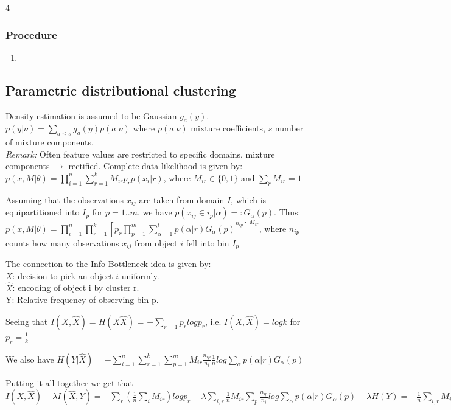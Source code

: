 \documentclass[9pt,parskip]{scrartcl}
\begin{document}
\begin{multicols*}{4}
\subsubsection*{Procedure}
\begin{enumerate}
	\item 
\end{enumerate}

\subsection*{Parametric distributional clustering}
Density estimation is assumed to be Gaussian $g_a(y)$. \\
$p(y| \nu) = \sum_{a \leq s} g_a(y) p(a|\nu)$ where $p(a|\nu)$ mixture coefficients, $s$ number of mixture components.\\
\textit{Remark:} Often feature values are restricted to specific domains, mixture components $\to$ rectified.
Complete data likelihood is given by: $p(x,M|\theta) = \prod_{i=1}^n \sum_{r=1}^k M_{ir}p_rp(x_i|r)$, where $M_{ir} \in \{0,1\}$ and $\sum_r M_{ir} = 1$

Assuming that the observations $x_{ij}$ are taken from domain $I$, which is equipartitioned into $I_p$ for $p= 1..m$, we have $p(x_{ij} \in i_p|\alpha) =: G_{\alpha}(p)$.
Thus:
$p(x,M|\theta) = \prod_{i=1}^n \prod_{r=1}^k[p_r \prod_{p=1}^m {\sum_{\alpha = 1}^l p(\alpha | r)G_{\alpha }(p)}^{n_{ip}}]^{M_{ir}}$,
where $n_{ip}$ counts how many observations $x_{ij}$ from object $i$ fell into bin $I_p$

The connection to the Info Bottleneck idea is given by:\\
$X$: decision to pick an object $i$ uniformly.\\
$\hat X$: encoding of object i by cluster r. \\
Y: Relative frequency of observing bin p.

Seeing that $I(X,\hat X) = H(X\hat X)$ = $-\sum_{r=1} p_r log p_r$, i.e. $I(X,\hat X) = log k$ for $p_r = \frac{1}{k}$

We also have $H(Y|\hat X) = - \sum_{i=1}^n \sum_{r=1}^k \sum_{p=1}^m M_{ir} \frac{n_{ip}}{n_i}\frac{1}{n} log \sum_{\alpha} p(\alpha|r)G_{\alpha}(p)$

Putting it all together we get that $I(X,\hat X) - \lambda I(\hat X, Y) = - \sum_r (\frac{1}{n}\sum_i M_{ir}) log p_r - \lambda \sum_{i,r} \frac{1}{n} M_{ir} \sum_p \frac{n_{ip}}{n_i}log \sum_{\alpha} p(\alpha|r)G_{\alpha}(p) - \lambda H(Y)
= - \frac{1}{n} \sum_{i,r} M_{ir}[log p_r + \frac{\lambda}{n_i} \sum_p n_{ip} log \sum_{\alpha} p(\alpha|r)G_{\alpha}(p)] - \lambda H(Y)$


\end{multicols*}
\end{document}
